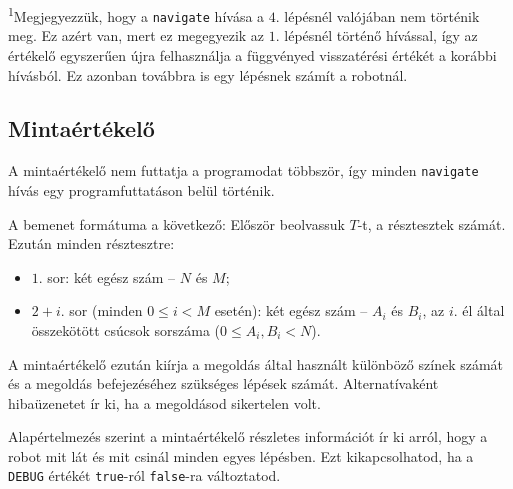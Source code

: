 \documentclass[12pt]{article}
\begin{document}
\textsuperscript{1}Megjegyezzük, hogy a \texttt{navigate} hívása a $4$. lépésnél valójában nem történik meg. Ez azért van, mert ez megegyezik az $1$. lépésnél történő hívással, így az értékelő egyszerűen újra felhasználja a függvényed visszatérési értékét a korábbi hívásból. Ez azonban továbbra is egy lépésnek számít a robotnál.

\subsection{Mintaértékelő}

A mintaértékelő nem futtatja a programodat többször, így minden \texttt{navigate} hívás egy programfuttatáson belül történik.

A bemenet formátuma a következő: Először beolvassuk $T$-t, a résztesztek számát. Ezután minden résztesztre:
\begin{itemize}
\item $1$. sor: két egész szám -- $N$ és $M$;
\item $2+i$. sor (minden $0 \leq i < M$ esetén): két egész szám -- $A_i$ és $B_i$, az $i$. él által összekötött csúcsok sorszáma ($0 \leq A_i, B_i < N$).
\end{itemize}

A mintaértékelő ezután kiírja a megoldás által használt különböző színek számát és a megoldás befejezéséhez szükséges lépések számát. Alternatívaként hibaüzenetet ír ki, ha a megoldásod sikertelen volt.

Alapértelmezés szerint a mintaértékelő részletes információt ír ki arról, hogy a robot mit lát és mit csinál minden egyes lépésben. Ezt kikapcsolhatod, ha a \texttt{DEBUG} értékét \texttt{true}-ról \texttt{false}-ra változtatod.
\end{document}

